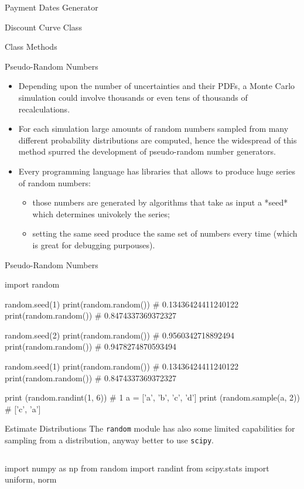 \documentclass{beamer}
\begin{document}
\begin{frame}[fragile]{Payment Dates Generator}
\begin{itemize}
\begin{frame}{Discount Curve Class}
\begin{frame}{Class Methods}
\begin{itemize}
\begin{iptyhon}
\begin{frame}{Pseudo-Random Numbers}
    \begin{itemize}
    \item  Depending upon the number of uncertainties and their PDFs, a Monte Carlo simulation could involve thousands or even tens of thousands of recalculations.
    \item For each simulation large amounts of random numbers sampled from many different probability distributions are computed, hence the widespread of this method spurred the development of pseudo-random number generators. 
    \item Every programming language has libraries that allows to produce huge series of random numbers:
    \begin{itemize}
        \item those numbers are generated by algorithms that take as input a *seed* which determines univokely the series; 
        \item setting the same seed produce the same set of numbers every time (which is great for debugging purpouses).
    \end{itemize}
    \end{itemize}
\end{frame}

\begin{frame}[fragile]{Pseudo-Random Numbers}  
\begin{ipython}
import random 

random.seed(1)
print(random.random())       # 0.13436424411240122
print(random.random())       # 0.8474337369372327

random.seed(2)
print(random.random())       # 0.9560342718892494
print(random.random())       # 0.9478274870593494

random.seed(1)
print(random.random())       # 0.13436424411240122
print(random.random())       # 0.8474337369372327

print (random.randint(1, 6)) # 1
a = ['a', 'b', 'c', 'd']
print (random.sample(a, 2))  # ['c', 'a']
\end{ipython}
\end{frame}

\begin{frame}[fragile]{Estimate Distributions}
The \texttt{random} module has also some limited capabilities for sampling from a distribution, anyway 
better to use \texttt{scipy}.

\begin{columns}
\begin{ipython}
import numpy as np
from random import randint
from scipy.stats import uniform, norm


\end{ipython}
\end{columns}
\end{frame}
\end{iptyhon}
\end{itemize}
\end{frame}
\end{frame}
\end{itemize}
\end{frame}
\end{document}
